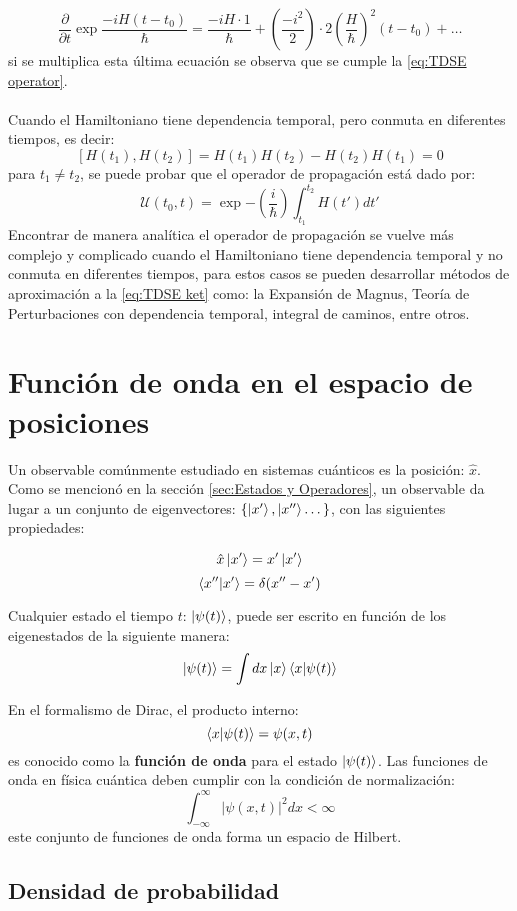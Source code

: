 $$\frac{\partial}{\partial t}\exp{\frac{-iH(t-t_0)}{\hbar}} = \frac{-iH\cdot 1}{\hbar}+ \left(\frac{-i^2}{2}\right)\cdot 2\left(\frac{H}{\hbar}\right)^2(t-t_0)+\dots $$
si se multiplica esta última ecuación se observa que se cumple la \autoref{eq:TDSE operator}.
\\\\
Cuando el Hamiltoniano tiene dependencia temporal, pero conmuta en diferentes tiempos, es decir:
$$[H(t_1), H(t_2)] = H(t_1)H(t_2) - H(t_2)H(t_1)=0$$
para $t_1 \neq t_2$, se puede probar que el operador de propagación está dado por:
$$\mathcal{U}(t_0,t) = \exp{-\left( \frac{i}{\hbar}\right)\int_{t_1}^{t_2}H(t')dt'}$$
Encontrar de manera analítica el operador de propagación se vuelve más complejo y complicado cuando el Hamiltoniano tiene dependencia temporal y no conmuta en diferentes tiempos, para estos casos se pueden desarrollar métodos de aproximación a la \autoref{eq:TDSE ket} como: la Expansión de Magnus, Teoría de Perturbaciones con dependencia temporal, integral de caminos, entre otros. \cite{Begzjav2020} \cite{Picasso2012}


\section{Función de onda en el espacio de posiciones}
Un observable comúnmente estudiado en sistemas cuánticos es la posición: $\hat{x}$. Como se mencionó en la sección \autoref{sec:Estados y Operadores}, un observable da lugar a un conjunto de eigenvectores: $\{\ket{x'}, \ket{x''}\dots \}$, con las siguientes propiedades:

$$\hat{x}\ket{x'} = x'\ket{x'}$$
$$\bra{x''}\ket{x'}=\delta(x''-x')$$

Cualquier estado el tiempo $t$: $\ket{\psi(t)}$, puede ser escrito en función de los eigenestados de la siguiente manera:
$$\ket{\psi(t)} = \int dx\ket{x}\bra{x}\ket{\psi(t)}$$

En el formalismo de Dirac, el producto interno:
$$\bra{x}\ket{\psi(t)} = \psi(x,t)$$
es conocido como la \textbf{función de onda} para el estado $\ket{\psi(t)}$. Las funciones de onda en física cuántica deben cumplir con la condición de normalización:
$$\int_{-\infty}^{\infty}| \psi(x,t)|^2dx < \infty $$
este conjunto de funciones de onda forma un espacio de Hilbert.

\subsection{Densidad de probabilidad}

